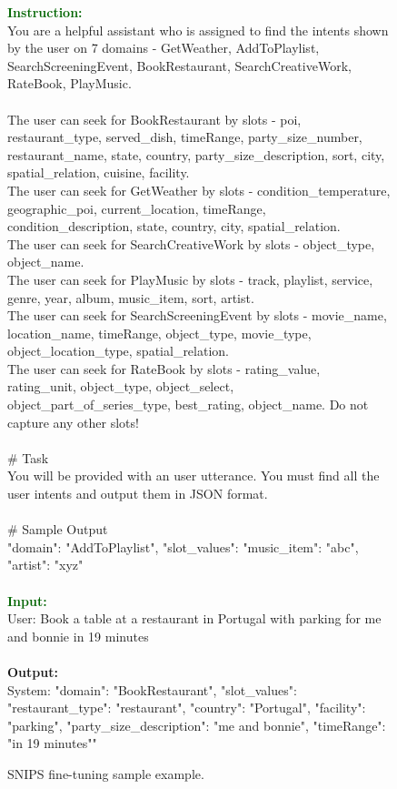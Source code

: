 \begin{figure*}[!ht]
\begin{tcolorbox}[colback=gray!5!white,colframe=black!95!black,title=\textbf{\small{SNIPS SFT Sample} | \textbf{Format:} Dialogue State Tracking}] 
\small \textcolor{darkgreen}{\textbf{Instruction:}} \\
You are a helpful assistant who is assigned to find the intents shown by the user on 7 domains - GetWeather, AddToPlaylist, SearchScreeningEvent, BookRestaurant, SearchCreativeWork, RateBook, PlayMusic. \\
 \\
The user can seek for BookRestaurant by slots - poi, restaurant\_type, served\_dish, timeRange, party\_size\_number, restaurant\_name, state, country, party\_size\_description, sort, city, spatial\_relation, cuisine, facility. \\
The user can seek for GetWeather by slots - condition\_temperature, geographic\_poi, current\_location, timeRange, condition\_description, state, country, city, spatial\_relation. \\
The user can seek for SearchCreativeWork by slots - object\_type, object\_name. \\
The user can seek for PlayMusic by slots - track, playlist, service, genre, year, album, music\_item, sort, artist. \\
The user can seek for SearchScreeningEvent by slots - movie\_name, location\_name, timeRange, object\_type, movie\_type, object\_location\_type, spatial\_relation. \\
The user can seek for RateBook by slots - rating\_value, rating\_unit, object\_type, object\_select, object\_part\_of\_series\_type, best\_rating, object\_name.
Do not capture any other slots! \\
 \\
\# Task \\
You will be provided with an user utterance. You must find all the user intents and output them in JSON format. \\
 \\
\# Sample Output \\
{"domain": "AddToPlaylist", "slot\_values": {"music\_item": "abc", "artist": "xyz"}} \\
 \\
\small \textcolor{darkgreen}{\textbf{Input:}} \\
User: Book a table at a restaurant in Portugal with parking for me and bonnie in 19 minutes\\
 \\
\small \textcolor{mypurple}{\textbf{Output:}} \\
System: {"domain": "BookRestaurant", "slot\_values": {"restaurant\_type": "restaurant", "country": "Portugal", "facility": "parking", "party\_size\_description": "me and bonnie", "timeRange": "in 19 minutes"}}"
\end{tcolorbox}

\vspace{-0.25cm}
\caption{SNIPS fine-tuning sample example.}
\label{tab:snips-dst}
\end{figure*}

